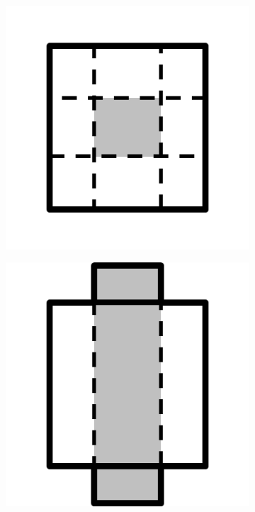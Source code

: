 \documentclass{article}
\begin{document}
\begin{figure}[!h]
\begin{subfigure}{.25\textwidth}
    \caption{}
    \label{fig:c8}
  \end{subfigure}\\
  \begin{subfigure}{.25\textwidth}
    \centering
    \includegraphics[width=.95\linewidth]{16cases/c9.png}
    \caption{}
    \label{fig:c9}
  \end{subfigure}%
  \begin{subfigure}{.25\textwidth}
    \centering
    \includegraphics[width=.95\linewidth]{16cases/c10.png}

\end{subfigure}
\end{figure}
\end{document}
